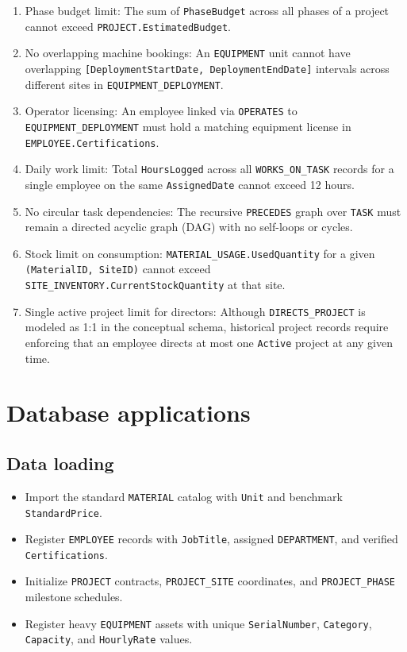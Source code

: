\documentclass[a4paper,12pt]{report}
\providecommand{\tightlist}{%
  \setlength{\itemsep}{0pt}\setlength{\parskip}{0pt}}
\begin{document}
\begin{enumerate}
\def\labelenumi{\arabic{enumi}.}
\tightlist
\item
  Phase budget limit: The sum of \texttt{PhaseBudget} across all phases of a project cannot exceed \texttt{PROJECT.\allowbreak{}EstimatedBudget}.
\item
  No overlapping machine bookings: An \texttt{EQUIPMENT} unit cannot have overlapping \texttt{{[}DeploymentStartDate, DeploymentEndDate{]}} intervals across different sites in \texttt{EQUIPMENT\_\allowbreak{}DEPLOYMENT}.
\item
  Operator licensing: An employee linked via \texttt{OPERATES} to \texttt{EQUIPMENT\_\allowbreak{}DEPLOYMENT} must hold a matching equipment license in \texttt{EMPLOYEE.\allowbreak{}Certifications}.
\item
  Daily work limit: Total \texttt{HoursLogged} across all \texttt{WORKS\_\allowbreak{}ON\_\allowbreak{}TASK} records for a single employee on the same \texttt{AssignedDate} cannot exceed 12 hours.
\item
  No circular task dependencies: The recursive \texttt{PRECEDES} graph over \texttt{TASK} must remain a directed acyclic graph (\allowbreak{}DAG) with no self-loops or cycles.
\item
  Stock limit on consumption: \texttt{MATERIAL\_\allowbreak{}USAGE.\allowbreak{}UsedQuantity} for a given \texttt{(\allowbreak{}\allowbreak{}MaterialID, SiteID)} cannot exceed \texttt{SITE\_\allowbreak{}INVENTORY.\allowbreak{}CurrentStockQuantity} at that site.
\item
  Single active project limit for directors: Although \texttt{DIRECTS\_\allowbreak{}PROJECT} is modeled as 1:1 in the conceptual schema, historical project records require enforcing that an employee directs at most one \texttt{Active} project at any given time.
\end{enumerate}

\chapter{Database applications}\label{database-applications}

\section{Data loading}\label{data-loading}

\begin{itemize}
\tightlist
\item
  Import the standard \texttt{MATERIAL} catalog with \texttt{Unit} and benchmark \texttt{StandardPrice}.
\item
  Register \texttt{EMPLOYEE} records with \texttt{JobTitle}, assigned \texttt{DEPARTMENT}, and verified \texttt{Certifications}.
\item
  Initialize \texttt{PROJECT} contracts, \texttt{PROJECT\_\allowbreak{}SITE} coordinates, and \texttt{PROJECT\_\allowbreak{}PHASE} milestone schedules.
\item
  Register heavy \texttt{EQUIPMENT} assets with unique \texttt{SerialNumber}, \texttt{Category}, \texttt{Capacity}, and \texttt{HourlyRate} values.
\end{itemize}
\end{document}
